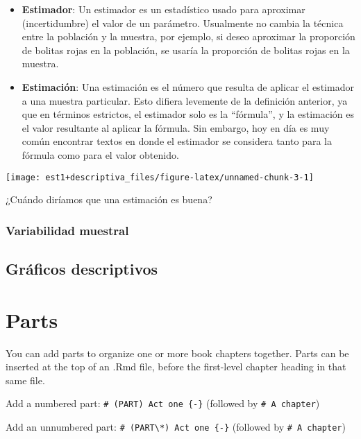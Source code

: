 \documentclass[
]{book}
\providecommand{\tightlist}{%
  \setlength{\itemsep}{0pt}\setlength{\parskip}{0pt}}
\theoremstyle{definition}
\theoremstyle{definition}
\theoremstyle{definition}
\theoremstyle{definition}
\theoremstyle{remark}
\begin{document}
\begin{itemize}
\tightlist
\item
  \textbf{Estimador}: Un estimador es un estadístico usado para aproximar (incertidumbre) el valor de un parámetro. Usualmente no cambia la técnica entre la población y la muestra, por ejemplo, si deseo aproximar la proporción de bolitas rojas en la población, se usaría la proporción de bolitas rojas en la muestra.
\item
  \textbf{Estimación}: Una estimación es el número que resulta de aplicar el estimador a una muestra particular. Esto difiera levemente de la definición anterior, ya que en términos estrictos, el estimador solo es la ``fórmula'', y la estimación es el valor resultante al aplicar la fórmula. Sin embargo, hoy en día es muy común encontrar textos en donde el estimador se considera tanto para la fórmula como para el valor obtenido.
\end{itemize}

\begin{center}\texttt{[image: est1+descriptiva\_files/figure-latex/unnamed-chunk-3-1]} \end{center}

¿Cuándo diríamos que una estimación es buena?

\hypertarget{variabilidad-muestral}{%
\subsection{Variabilidad muestral}\label{variabilidad-muestral}}

\hypertarget{gruxe1ficos-descriptivos}{%
\section{Gráficos descriptivos}\label{gruxe1ficos-descriptivos}}

\hypertarget{parts}{%
\chapter{Parts}\label{parts}}

You can add parts to organize one or more book chapters together. Parts can be inserted at the top of an .Rmd file, before the first-level chapter heading in that same file.

Add a numbered part: \texttt{\#\ (PART)\ Act\ one\ \{-\}} (followed by \texttt{\#\ A\ chapter})

Add an unnumbered part: \texttt{\#\ (PART\textbackslash{}*)\ Act\ one\ \{-\}} (followed by \texttt{\#\ A\ chapter})
\end{document}
